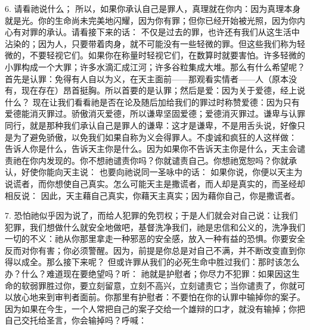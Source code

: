 6. 请看祂说什么； 所以，如果你承认自己是罪人，真理就在你内：因为真理本身就是光。你的生命尚未完美地闪耀，因为你有罪；但你已经开始被光照，因为你内心有对罪的承认。请看接下来的话： 不仅是过去的罪，也许还有我们从这生活中沾染的；因为人，只要带着肉身，就不可能没有一些轻微的罪。但这些我们称为轻微的，不要轻视它们。如果你在称量时轻视它们，在数算时就要害怕。许多轻微的小罪构成一个大罪；许多水滴汇成江河；许多谷粒集成大堆。那么有什么希望呢？首先是认罪：免得有人自以为义，在天主面前——那观看实情者——人（原本没有，现在存在）昂首挺胸。所以首要的是认罪；然后是爱：因为关于爱德，经上说什么？ 现在让我们看看祂是否在论及随后加给我们的罪过时称赞爱德：因为只有爱德能消灭罪过。骄傲消灭爱德，所以谦卑坚固爱德；爱德消灭罪过。谦卑与认罪同行，就是那种我们承认自己是罪人的谦卑：这才是谦卑，不是用舌头说，好像只是为了避免骄傲，以免我们如果自称为义会得罪人。不虔诚和疯狂的人这样做： 告诉人你是什么，告诉天主你是什么。因为如果你不告诉天主你是什么，天主会谴责祂在你内发现的。你不想祂谴责你吗？你就谴责自己。你想祂宽恕吗？你就承认，好使你能向天主说： 也要向祂说同一圣咏中的话：  如果你说，你便以天主为说谎者，而你想使自己真实。怎么可能天主是撒谎者，而人却是真实的，而圣经却相反说： 因此，天主藉自己真实，你藉天主真实；因为藉你自己，你是撒谎者。\par

7. 恐怕祂似乎因为说了，而给人犯罪的免罚权；于是人们就会对自己说：让我们犯罪，我们想做什么就安全地做吧，基督洗净我们，祂是忠信和公义的，洗净我们一切的不义：祂从你那里拿走一种邪恶的安全感，放入一种有益的恐惧。你要安全反而对你有害；你必须警醒。因为，前提是你总是对自己不满，并不断改变直到你得以成全。那么接下来呢？ 但或许罪从我们的必死生命中胜过我们：那时该怎么办？什么？难道现在要绝望吗？听： 祂就是护慰者；你尽力不犯罪：如果因这生命的软弱罪胜过你，要立刻留意，立刻不高兴，立刻谴责它；当你谴责了，你就可以放心地来到审判者面前。你那里有护慰者：不要怕在你的认罪中输掉你的案子。因为如果在今生，一个人常把自己的案子交给一个雄辩的口才，就没有输掉；你把自己交托给圣言，你会输掉吗？呼喊：\par

